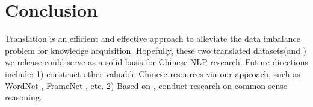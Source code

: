 \section{Conclusion}	
\label{sec:conclusion}	
Translation is an efficient and effective approach to alleviate the data imbalance problem for knowledge acquisition. Hopefully, these two translated datasets(\zhcon and \zhpro) we release could serve as a solid basis for Chinese NLP research. Future directions include: 1) construct other valuable Chinese resources via our approach, such as WordNet \cite{miller1998wordnet}, FrameNet \cite{Baker_98}, etc. 2) Based on \zhcon, conduct research on common sense reasoning. 





